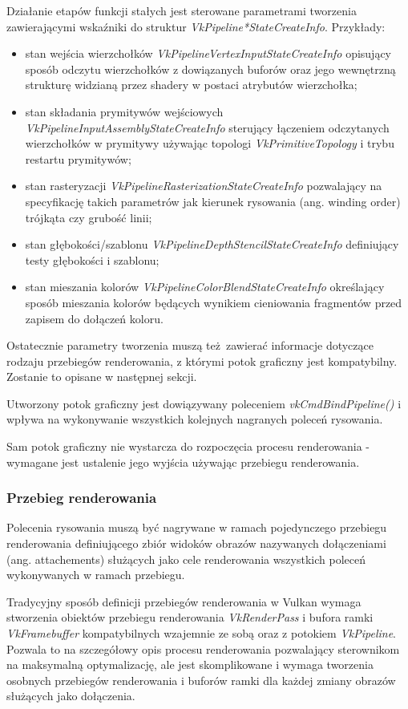 Działanie etapów funkcji stałych jest sterowane parametrami tworzenia zawierającymi wskaźniki do struktur \textit{VkPipeline*StateCreateInfo}.
Przykłady:
\begin{itemize}
\item stan wejścia wierzchołków \textit{VkPipelineVertexInputStateCreateInfo} opisujący sposób odczytu wierzchołków z dowiązanych buforów oraz jego wewnętrzną strukturę widzianą przez shadery w postaci atrybutów wierzchołka;
\item stan składania prymitywów wejściowych \textit{VkPipelineInputAssemblyStateCreateInfo} sterujący łączeniem odczytanych wierzchołków w prymitywy używając topologi \textit{VkPrimitiveTopology} i trybu restartu prymitywów;
\item stan rasteryzacji \textit{VkPipelineRasterizationStateCreateInfo} pozwalający na specyfikację takich parametrów jak kierunek rysowania (ang. winding order) trójkąta czy grubość linii;
\item stan głębokości/szablonu \textit{VkPipelineDepthStencilStateCreateInfo} definiujący testy głębokości i szablonu;
\item stan mieszania kolorów \textit{VkPipelineColorBlendStateCreateInfo} określający sposób mieszania kolorów będących wynikiem cieniowania fragmentów przed zapisem do dołączeń koloru.
\end{itemize}

Ostatecznie parametry tworzenia muszą też zawierać informacje dotyczące rodzaju przebiegów renderowania, z którymi potok graficzny jest kompatybilny. Zostanie to opisane w następnej sekcji.

Utworzony potok graficzny jest dowiązywany poleceniem \textit{vkCmdBindPipeline()} i wpływa na wykonywanie wszystkich kolejnych nagranych poleceń rysowania.

Sam potok graficzny nie wystarcza do rozpoczęcia procesu renderowania - wymagane jest ustalenie jego wyjścia używając przebiegu renderowania.


\subsubsection {Przebieg renderowania}

Polecenia rysowania muszą być nagrywane w ramach pojedynczego przebiegu renderowania definiującego zbiór widoków obrazów nazywanych dołączeniami (ang. attachements) służących jako cele renderowania wszystkich poleceń wykonywanych w ramach przebiegu.

Tradycyjny sposób definicji przebiegów renderowania w Vulkan wymaga stworzenia obiektów przebiegu renderowania \textit{VkRenderPass} i bufora ramki \textit{VkFramebuffer} kompatybilnych wzajemnie ze sobą oraz z potokiem \textit{VkPipeline}. Pozwala to na szczegółowy opis procesu renderowania pozwalający sterownikom na maksymalną optymalizację, ale jest skomplikowane i wymaga tworzenia osobnych przebiegów renderowania i buforów ramki dla każdej zmiany obrazów służących jako dołączenia.

